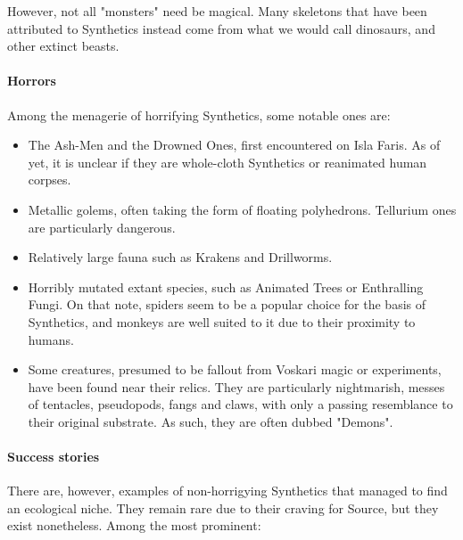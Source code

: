 However, not all "monsters" need be magical. Many skeletons that have been attributed to Synthetics instead come from what we would call dinosaurs, and other extinct beasts.



\paragraph{Horrors}

Among the menagerie of horrifying Synthetics, some notable ones are:

\begin{itemize}
    \item The Ash-Men and the Drowned Ones, first encountered on Isla Faris. As of yet, it is unclear if they are whole-cloth Synthetics or reanimated human corpses.
    \item Metallic golems, often taking the form of floating polyhedrons. Tellurium ones are particularly dangerous.
    \item Relatively large fauna such as Krakens and Drillworms.
    \item Horribly mutated extant species, such as Animated Trees or Enthralling Fungi. On that note, spiders seem to be a popular choice for the basis of Synthetics, and monkeys are well suited to it due to their proximity to humans.
    \item Some creatures, presumed to be fallout from Voskari magic or experiments, have been found near their relics. They are particularly nightmarish, messes of tentacles, pseudopods, fangs and claws, with only a passing resemblance to their original substrate. As such, they are often dubbed "Demons".
\end{itemize}

\paragraph{Success stories}

There are, however, examples of non-horrigying Synthetics that managed to find an ecological niche. They remain rare due to their craving for Source, but they exist nonetheless. Among the most prominent:

